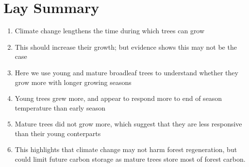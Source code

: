 

\chapter{Lay Summary}

\begin{enumerate}
	\item Climate change lengthens the time during which trees can grow
	\item This should increase their growth; but evidence shows this may not be the case
	\item Here we use young and mature broadleaf trees to understand whether they grow more with longer growing seasons
	\item Young trees grew more, and appear to respond more to end of season temperature than early season
	\item Mature trees did not grow more, which suggest that they are less responsive than their young conterparts
	\item This highlights that climate change may not harm forest regeneration, but could limit future carbon storage as mature trees store most of forest carbon.
\end{enumerate}